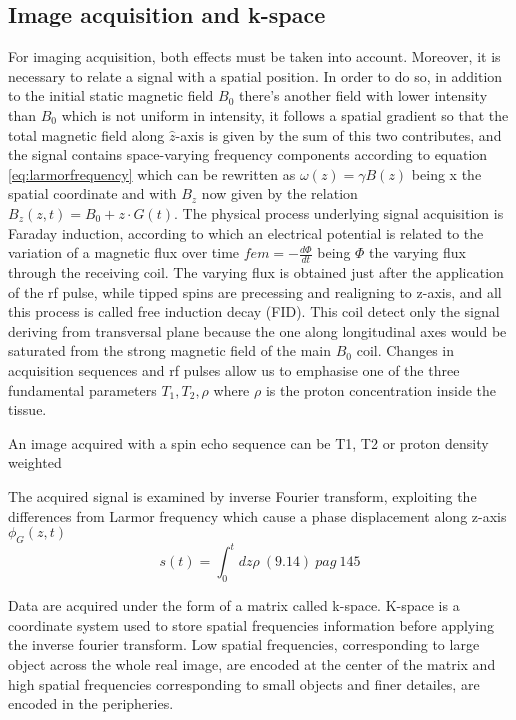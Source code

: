 \documentclass[a4paper,11pt]{article}
\begin{document}
\subsection{Image acquisition and k-space}
For imaging acquisition, both effects must be taken into account. Moreover, it is necessary to relate a signal with a spatial position.
In order to do so, in addition to the initial static magnetic field $B_0$ there's another field with lower intensity than $B_0$ which is not uniform in intensity, it follows a spatial gradient so that the total magnetic field along $\hat z$-axis is given by the sum of this two contributes, and the signal contains space-varying frequency components according to equation \ref{eq:larmorfrequency} which can be rewritten as $\omega(z) = \gamma B(z)$ being x the spatial coordinate and with $B_z$ now given by the relation $B_z(z, t) = B_0 + z\cdot G(t)$.
The physical process underlying signal acquisition is Faraday induction, according to which an electrical potential is related to the variation of a magnetic flux over time $fem = -\frac{d\Phi}{dt}$ being $\Phi$ the varying flux through the receiving coil.
The varying flux is obtained just after the application of the rf pulse, while tipped spins are precessing and realigning to z-axis, and all this process is called free induction decay (FID). This coil detect only the signal deriving from transversal plane because the one along longitudinal axes would be saturated from the strong magnetic field of the main $B_0$ coil. Changes in acquisition sequences and rf pulses allow us to emphasise one of the three fundamental parameters $T_1, T_2, \rho$ where $\rho$ is the proton concentration inside the tissue.

An image acquired with a spin echo sequence can be T1, T2 or proton density weighted

The acquired signal is examined by inverse Fourier transform, exploiting the differences from Larmor frequency which cause a phase displacement along z-axis $\phi_G(z, t)$
\begin{equation}
s(t) = \int_0^tdz\rho \ (9.14) \ pag \ 145
\end{equation}

Data are acquired under the form of a matrix called k-space.
K-space is a coordinate system used to store spatial frequencies information before applying the inverse fourier transform.
Low spatial frequencies, corresponding to large object across the whole real image, are encoded at the center of the matrix and high spatial frequencies corresponding to small objects and finer detailes, are encoded in the peripheries.
\end{document}
